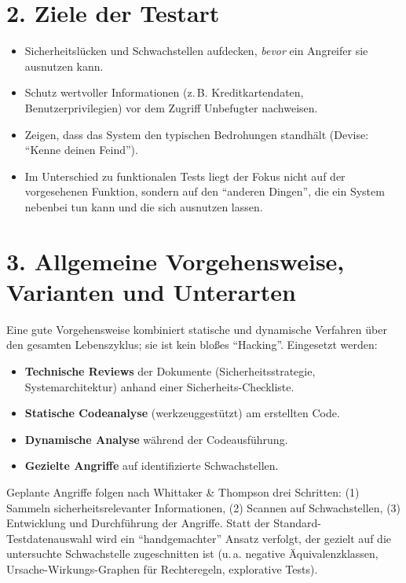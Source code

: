\documentclass[
	fontsize=12pt,          %
	paper=a4,               %
	numbers=noenddot,       %
	listof=totoc,           %
	listof=entryprefix,     %
	listof=nochaptergap,    %
	bibliography=totoc,     %
	parskip=half,           %
	openany                 %
]{scrbook}
\begin{document}
\section*{2. Ziele der Testart}

\begin{itemize}
	\item Sicherheitslücken und Schwachstellen aufdecken, \emph{bevor} ein
	      Angreifer sie ausnutzen kann.
	\item Schutz wertvoller Informationen (z.\,B. Kreditkartendaten,
	      Benutzerprivilegien) vor dem Zugriff Unbefugter nachweisen.
	\item Zeigen, dass das System den typischen Bedrohungen standhält
	      (Devise: ``Kenne deinen Feind'').
	\item Im Unterschied zu funktionalen Tests liegt der Fokus nicht auf der
	      vorgesehenen Funktion, sondern auf den ``anderen Dingen'', die ein
	      System nebenbei tun kann und die sich ausnutzen lassen.
\end{itemize}

\section*{3. Allgemeine Vorgehensweise, Varianten und Unterarten}

Eine gute Vorgehensweise kombiniert statische und dynamische Verfahren über den
gesamten Lebenszyklus; sie ist kein bloßes ``Hacking''.
Eingesetzt werden:

\begin{itemize}
	\item \textbf{Technische Reviews} der Dokumente (Sicherheitsstrategie,
	      Systemarchitektur) anhand einer Sicherheits-Checkliste.
	\item \textbf{Statische Codeanalyse} (werkzeuggestützt) am erstellten Code.
	\item \textbf{Dynamische Analyse} während der Codeausführung.
	\item \textbf{Gezielte Angriffe} auf identifizierte Schwachstellen.
\end{itemize}

Geplante Angriffe folgen nach Whittaker \& Thompson drei Schritten:
(1) Sammeln sicherheitsrelevanter Informationen, (2) Scannen auf Schwachstellen,
(3) Entwicklung und Durchführung der Angriffe.
Statt der Standard-Testdatenauswahl wird ein ``handgemachter'' Ansatz verfolgt,
der gezielt auf die untersuchte Schwachstelle zugeschnitten ist (u.\,a. negative
Äquivalenzklassen, Ursache-Wirkungs-Graphen für Rechteregeln, explorative Tests).
\end{document}
